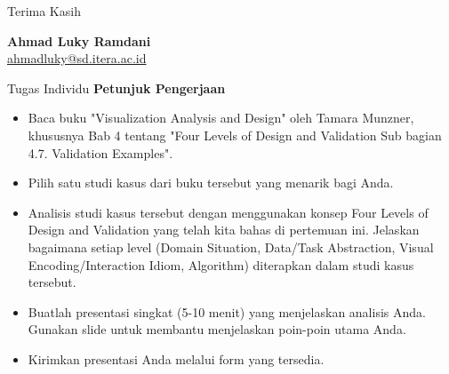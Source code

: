 \documentclass[t]{beamer}
\begin{document}
\begin{frame}[c]
    \centering
    \Huge{Terima Kasih} %
    
    \vspace{1.5cm}
    \normalsize
    \textbf{Ahmad Luky Ramdani} \\ %
    \href{mailto:ahmadluky@sd.itera.ac.id}{ahmadluky@sd.itera.ac.id} %
\end{frame}



\begin{frame}{Tugas Individu}
\textbf{Petunjuk Pengerjaan}
\begin{itemize}
    \item Baca buku "Visualization Analysis and Design" oleh Tamara Munzner, khususnya Bab 4 tentang "Four Levels of Design and Validation Sub bagian 4.7. Validation Examples".
    \item Pilih satu studi kasus dari buku tersebut yang menarik bagi Anda.
	\item Analisis studi kasus tersebut dengan menggunakan konsep Four Levels of Design and Validation yang telah kita bahas di pertemuan ini. Jelaskan bagaimana setiap level (Domain Situation, Data/Task Abstraction, Visual Encoding/Interaction Idiom, Algorithm) diterapkan dalam studi kasus tersebut.
	\item Buatlah presentasi singkat (5-10 menit) yang menjelaskan analisis Anda. Gunakan slide untuk membantu menjelaskan poin-poin utama Anda.
	\item Kirimkan presentasi Anda melalui form yang tersedia.
\end{itemize}
\end{frame}
\end{document}
